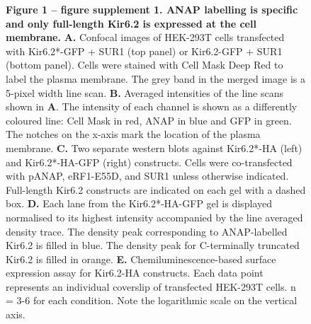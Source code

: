 \documentclass[9pt,lineno, onehalfspacing]{elife_modified}
\begin{document}
\begin{figure}[t]\ContinuedFloat
\begin{fullwidth}
\captionsetup{labelformat=empty}
\caption{\textbf{Figure 1 -- figure supplement 1. ANAP labelling is specific and only full-length Kir6.2 is expressed at the cell membrane.}
\textbf{A.}
Confocal images of HEK-293T cells transfected with Kir6.2*-GFP + SUR1 (top panel) or Kir6.2-GFP + SUR1 (bottom panel).
Cells were stained with Cell Mask Deep Red to label the plasma membrane.
The grey band in the merged image is a 5-pixel width line scan.
\textbf{B.}
Averaged intensities of the line scans shown in \textbf{A}.
The intensity of each channel is shown as a differently coloured line: Cell Mask in red, ANAP in blue and GFP in green.
The notches on the x-axis mark the location of the plasma membrane.
\textbf{C.}
Two separate western blots against Kir6.2*-HA (left) and Kir6.2*-HA-GFP (right) constructs.
Cells were co-transfected with pANAP, eRF1-E55D, and SUR1 unless otherwise indicated.
Full-length Kir6.2 constructs are indicated on each gel with a dashed box.
\textbf{D.}
Each lane from the Kir6.2*-HA-GFP gel is displayed normalised to its highest intensity accompanied by the line averaged density trace.
The density peak corresponding to ANAP-labelled Kir6.2 is filled in blue. The density peak for C-terminally truncated Kir6.2 is filled in orange.
\textbf{E.}
Chemiluminescence-based surface expression assay for Kir6.2-HA constructs.
Each data point represents an individual coverslip of transfected HEK-293T cells.
n = 3-6 for each condition.
Note the logarithmic scale on the vertical axis.
}
\end{fullwidth}
\end{figure}
\FloatBarrier
\end{document}
